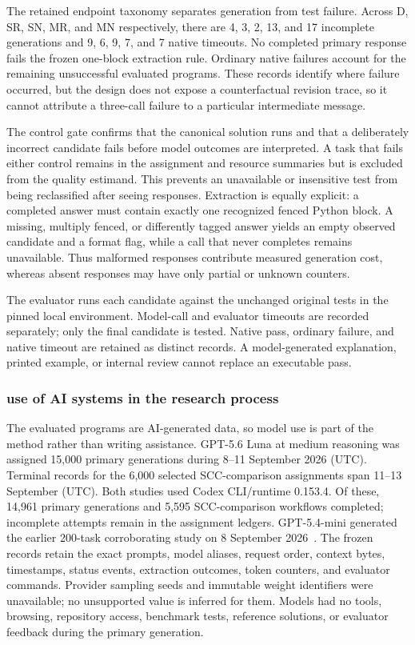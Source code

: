 \documentclass[10pt,letterpaper]{article}
\begin{document}
The retained endpoint taxonomy separates generation from test failure. Across D, SR, SN, MR, and MN respectively, there are 4, 3, 2, 13, and 17 incomplete generations and 9, 6, 9, 7, and 7 native timeouts. No completed primary response fails the frozen one-block extraction rule. Ordinary native failures account for the remaining unsuccessful evaluated programs. These records identify where failure occurred, but the design does not expose a counterfactual revision trace, so it cannot attribute a three-call failure to a particular intermediate message.

The control gate confirms that the canonical solution runs and that a deliberately incorrect candidate fails before model outcomes are interpreted. A task that fails either control remains in the assignment and resource summaries but is excluded from the quality estimand. This prevents an unavailable or insensitive test from being reclassified after seeing responses. Extraction is equally explicit: a completed answer must contain exactly one recognized fenced Python block. A missing, multiply fenced, or differently tagged answer yields an empty observed candidate and a format flag, while a call that never completes remains unavailable. Thus malformed responses contribute measured generation cost, whereas absent responses may have only partial or unknown counters.

The evaluator runs each candidate against the unchanged original tests in the pinned local environment. Model-call and evaluator timeouts are recorded separately; only the final candidate is tested. Native pass, ordinary failure, and native timeout are retained as distinct records. A model-generated explanation, printed example, or internal review cannot replace an executable pass.

\subsubsection*{use of AI systems in the research process}
The evaluated programs are AI-generated data, so model use is part of the method rather than writing assistance. GPT-5.6 Luna at medium reasoning was assigned 15,000 primary generations during 8--11 September 2026 (UTC). Terminal records for the 6,000 selected SCC-comparison assignments span 11--13 September (UTC). Both studies used Codex CLI/runtime 0.153.4. Of these, 14,961 primary generations and 5,595 SCC-comparison workflows completed; incomplete attempts remain in the assignment ledgers. GPT-5.4-mini generated the earlier 200-task corroborating study on 8 September 2026~\cite{openai54mini2026}. The frozen records retain the exact prompts, model aliases, request order, context bytes, timestamps, status events, extraction outcomes, token counters, and evaluator commands. Provider sampling seeds and immutable weight identifiers were unavailable; no unsupported value is inferred for them. Models had no tools, browsing, repository access, benchmark tests, reference solutions, or evaluator feedback during the primary generation.
\end{document}
